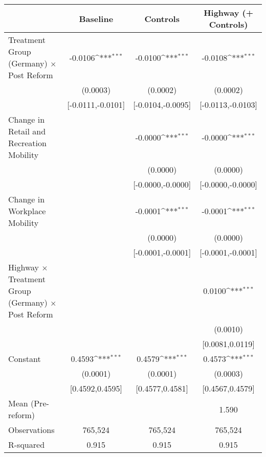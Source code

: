 {
\def\sym#1{\ifmmode^{#1}\else\(^{#1}\)\fi}
\begin{tabular}{l*{3}{c}}
\toprule
                    &\multicolumn{1}{c}{Baseline}&\multicolumn{1}{c}{Controls}&\multicolumn{1}{c}{Highway (+ Controls)}\\
\midrule
Treatment Group (Germany) $\times$ Post Reform&     -0.0106\sym{***}&     -0.0100\sym{***}&     -0.0108\sym{***}\\
                    &    (0.0003)         &    (0.0002)         &    (0.0002)         \\
                    &[-0.0111,-0.0101]         &[-0.0104,-0.0095]         &[-0.0113,-0.0103]         \\
Change in Retail and Recreation Mobility&                     &     -0.0000\sym{***}&     -0.0000\sym{***}\\
                    &                     &    (0.0000)         &    (0.0000)         \\
                    &                     &[-0.0000,-0.0000]         &[-0.0000,-0.0000]         \\
Change in Workplace Mobility&                     &     -0.0001\sym{***}&     -0.0001\sym{***}\\
                    &                     &    (0.0000)         &    (0.0000)         \\
                    &                     &[-0.0001,-0.0001]         &[-0.0001,-0.0001]         \\
Highway $\times$ Treatment Group (Germany) $\times$ Post Reform&                     &                     &      0.0100\sym{***}\\
                    &                     &                     &    (0.0010)         \\
                    &                     &                     &[0.0081,0.0119]         \\
Constant            &      0.4593\sym{***}&      0.4579\sym{***}&      0.4573\sym{***}\\
                    &    (0.0001)         &    (0.0001)         &    (0.0003)         \\
                    &[0.4592,0.4595]         &[0.4577,0.4581]         &[0.4567,0.4579]         \\
\midrule
Mean (Pre-reform)   &                     &                     &       1.590         \\
Observations        &     765,524         &     765,524         &     765,524         \\
R-squared           &       0.915         &       0.915         &       0.915         \\
\bottomrule
\end{tabular}
}
